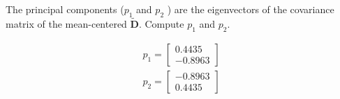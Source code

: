 The principal components ($p_1$ and $p_2$ ) are the eigenvectors of the covariance matrix of the mean-centered $\boldsymbol{\tilde{D}}$. Compute $p_1$ and $p_2$.

\begin{solution}
    \begin{align*}
        p_1 = \begin{bmatrix}
            0.4435 \\ -0.8963
        \end{bmatrix} \\
        p_2 = \begin{bmatrix}
            -0.8963 \\ 0.4435
        \end{bmatrix}
    \end{align*}
\end{solution}